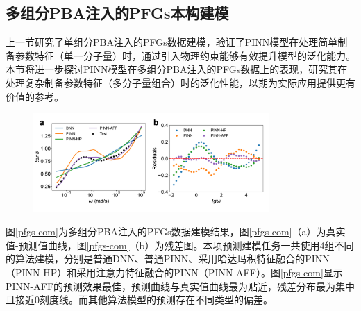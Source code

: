 \subsection{多组分PBA注入的PFGs本构建模}
上一节研究了单组分PBA注入的PFGs数据建模，验证了PINN模型在处理简单制备参数特征（单一分子量）时，通过引入物理约束能够有效提升模型的泛化能力。本节将进一步探讨PINN模型在多组分PBA注入的PFGs数据上的表现，研究其在处理复杂制备参数特征（多分子量组合）时的泛化性能，以期为实际应用提供更有价值的参考。
\begin{figure}[htbp]
  \centering
  \includegraphics[width=0.8\textwidth]{Fig/pfgs-com.pdf}
\end{figure}
图\ref{pfgs-com}为多组分PBA注入的PFGs数据建模结果，图\ref{pfgs-com}（a）为真实值-预测值曲线，图\ref{pfgs-com}（b）为残差图。本项预测建模任务一共使用4组不同的算法建模，分别是普通DNN、普通PINN、采用哈达玛积特征融合的PINN（PINN-HP）和采用注意力特征融合的PINN（PINN-AFF）。图\ref{pfgs-com}显示PINN-AFF的预测效果最佳，预测曲线与真实值曲线最为贴近，残差分布最为集中且接近0刻度线。而其他算法模型的预测存在不同类型的偏差。

